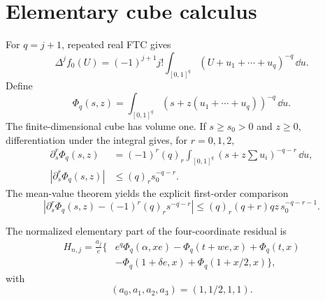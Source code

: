 \documentclass[12pt]{article}
\begin{document}
\section{Elementary cube calculus}\label{sec:cube}

For $q=j+1$, repeated real FTC gives
\begin{equation}\label{eq:cube-ftc}
 \Delta^jf_0(U)=(-1)^{j+1}j!
 \int_{[0,1]^q}(U+u_1+\cdots+u_q)^{-q}\,\dd u.
\end{equation}
Define
\begin{equation}\label{eq:Phi}
 \Phi_q(s,z)=\int_{[0,1]^q}
 (s+z(u_1+\cdots+u_q))^{-q}\,\dd u.
\end{equation}
The finite-dimensional cube has volume one.  If $s\ge s_0>0$ and $z\ge0$,
differentiation under the integral gives, for $r=0,1,2$,
\begin{align}
 \partial_s^r\Phi_q(s,z)
 &=(-1)^r(q)_r\int_{[0,1]^q}
 (s+z\textstyle\sum u_i)^{-q-r}\,\dd u,
 \label{eq:Phi-derivative}\\
 |\partial_s^r\Phi_q(s,z)|&\le(q)_rs_0^{-q-r}.
 \label{eq:Phi-bound}
\end{align}
The mean-value theorem yields the explicit first-order comparison
\begin{equation}\label{eq:Phi-error}
 \left|\partial_s^r\Phi_q(s,z)-(-1)^r(q)_rs^{-q-r}\right|
 \le(q)_r(q+r)qz\,s_0^{-q-r-1}.
\end{equation}

The normalized elementary part of the four-coordinate residual is
\begin{align}
 H_{n,j}=\frac{a_j}{e}\{&e^q\Phi_q(\alpha,xe)
 -\Phi_q(t+we,x)+\Phi_q(t,x)\nonumber\\
 &-\Phi_q(1+\delta e,x)+\Phi_q(1+x/2,x)\},
 \label{eq:Hnj}
\end{align}
with
\begin{equation}\label{eq:aj}
 (a_0,a_1,a_2,a_3)=(1,1/2,1,1).
\end{equation}
\end{document}
